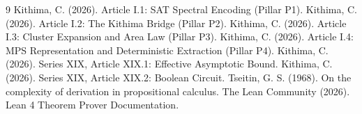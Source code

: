 \documentclass[11pt,a4paper]{article}
\begin{document}

\begin{thebibliography}{9}
  Kithima, C. (2026). Article I.1: SAT Spectral Encoding (Pillar P1).
  Kithima, C. (2026). Article I.2: The Kithima Bridge (Pillar P2).
  Kithima, C. (2026). Article I.3: Cluster Expansion and Area Law (Pillar P3).
  Kithima, C. (2026). Article I.4: MPS Representation and Deterministic Extraction (Pillar P4).
  Kithima, C. (2026). Series XIX, Article XIX.1: Effective Asymptotic Bound.
  Kithima, C. (2026). Series XIX, Article XIX.2: Boolean Circuit.
  Tseitin, G. S. (1968). On the complexity of derivation in propositional calculus.
  The Lean Community (2026). Lean 4 Theorem Prover Documentation.
\end{thebibliography}
\end{document}
